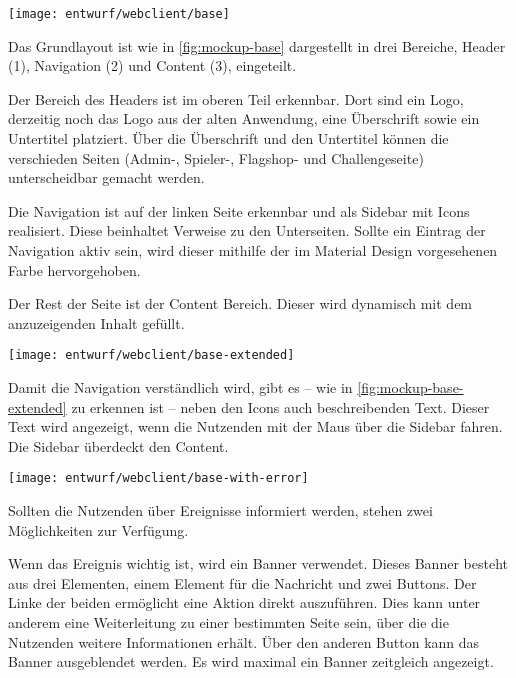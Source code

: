 \begin{center}
	\texttt{[image: entwurf/webclient/base]}
	\label{fig:mockup-base}
\end{center}

Das Grundlayout ist wie in \autoref{fig:mockup-base} dargestellt in drei Bereiche, Header (1), Navigation (2) und Content (3), eingeteilt. 

Der Bereich des Headers ist im oberen Teil erkennbar. Dort sind ein Logo, derzeitig noch das Logo aus der alten Anwendung, eine Überschrift sowie ein Untertitel platziert. Über die Überschrift und den Untertitel können die verschieden Seiten (Admin-, Spieler-, Flagshop- und Challengeseite) unterscheidbar gemacht werden.

Die Navigation ist auf der linken Seite erkennbar und als Sidebar mit Icons realisiert. Diese beinhaltet Verweise zu den Unterseiten. Sollte ein Eintrag der Navigation aktiv sein, wird dieser mithilfe der im Material Design vorgesehenen Farbe hervorgehoben.

Der Rest der Seite ist der Content Bereich. Dieser wird dynamisch mit dem anzuzeigenden Inhalt gefüllt.

\begin{center}
	\texttt{[image: entwurf/webclient/base-extended]}
	\label{fig:mockup-base-extended}
\end{center}

Damit die Navigation verständlich wird, gibt es -- wie in \autoref{fig:mockup-base-extended} zu erkennen ist -- neben den Icons auch beschreibenden Text. Dieser Text wird angezeigt, wenn die Nutzenden mit der Maus über die Sidebar fahren. Die Sidebar überdeckt den Content.

\begin{center}
	\texttt{[image: entwurf/webclient/base-with-error]}
	\label{fig:mockup-base-with-error}
\end{center}

Sollten die Nutzenden über Ereignisse informiert werden, stehen zwei Möglichkeiten zur Verfügung.

Wenn das Ereignis wichtig ist, wird ein Banner verwendet. Dieses Banner besteht aus drei Elementen, einem Element für die Nachricht und zwei Buttons. Der Linke der beiden ermöglicht eine Aktion direkt auszuführen. Dies kann unter anderem eine Weiterleitung zu einer bestimmten Seite sein, über die die Nutzenden weitere Informationen erhält. Über den anderen Button kann das Banner ausgeblendet werden. Es wird maximal ein Banner zeitgleich angezeigt.

